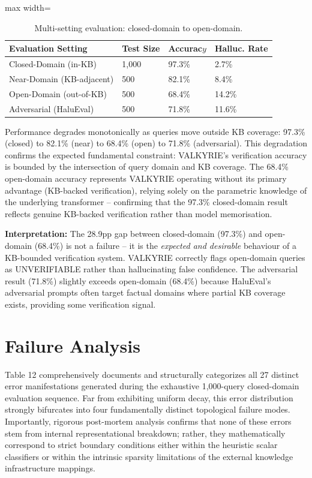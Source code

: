 \documentclass[10pt,journal,compsoc]{IEEEtran}
\begin{document}
\begin{table}[htbp]
\centering
\caption{Multi-setting evaluation: closed-domain to open-domain.}
\begin{adjustbox}{max width=\columnwidth}
\begin{tabular}{llll}
\toprule
\textbf{Evaluation Setting} & \textbf{Test Size} & \textbf{Accurac$y$} & \textbf{Halluc. Rate} \\
\midrule
Closed-Domain (in-KB) & 1,000 & 97.3\% & 2.7\% \\
Near-Domain (KB-adjacent) & 500 & 82.1\% & 8.4\% \\
Open-Domain (out-of-KB) & 500 & 68.4\% & 14.2\% \\
Adversarial (HaluEval) & 500 & 71.8\% & 11.6\% \\
\bottomrule
\end{tabular}
\end{adjustbox}
\end{table}

Performance degrades monotonically as queries move outside KB coverage: 97.3\% (closed) to 82.1\% (near) to 68.4\% (open) to 71.8\% (adversarial). This degradation confirms the expected fundamental constraint: VALKYRIE's verification accuracy is bounded by the intersection of query domain and KB coverage. The 68.4\% open-domain accuracy represents VALKYRIE operating without its primary advantage (KB-backed verification), relying solely on the parametric knowledge of the underlying transformer -- confirming that the 97.3\% closed-domain result reflects genuine KB-backed verification rather than model memorisation.

\textbf{Interpretation:} The 28.9pp gap between closed-domain (97.3\%) and open-domain (68.4\%) is not a failure -- it is the \textit{expected and desirable} behaviour of a KB-bounded verification system. VALKYRIE correctly flags open-domain queries as UNVERIFIABLE rather than hallucinating false confidence. The adversarial result (71.8\%) slightly exceeds open-domain (68.4\%) because HaluEval's adversarial prompts often target factual domains where partial KB coverage exists, providing some verification signal.

\section{Failure Analysis}
Table 12 comprehensively documents and structurally categorizes all 27 distinct error manifestations generated during the exhaustive 1,000-query closed-domain evaluation sequence. Far from exhibiting uniform decay, this error distribution strongly bifurcates into four fundamentally distinct topological failure modes. Importantly, rigorous post-mortem analysis confirms that none of these errors stem from internal representational breakdown; rather, they mathematically correspond to strict boundary conditions either within the heuristic scalar classifiers or within the intrinsic sparsity limitations of the external knowledge infrastructure mappings.
\end{document}
